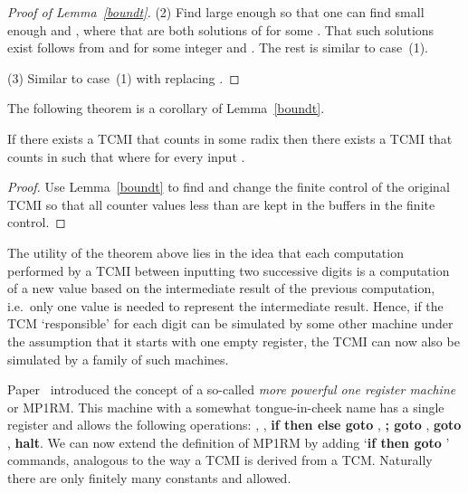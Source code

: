\documentclass[12pt]{article}
\begin{document}
\begin{proof}[Proof of Lemma~\ref{boundt}]
(2) Find  large enough so that one can find small enough  and
, where  that are both solutions of  for some . That such
solutions exist follows from  and  for some integer  and . The rest is
similar to case~(1).

(3) Similar to case~(1) with  replacing .
\end{proof}

The following theorem is a corollary of Lemma~\ref{boundt}.
\begin{theorem}\label{tcmired}
If there exists a TCMI that counts in some radix  then
there exists a TCMI  that counts in  such that
 where  for every input .
\end{theorem}
\begin{proof}
Use Lemma~\ref{boundt} to find  and change the finite control of the
original TCMI so that all counter values less than  are kept in the
buffers in the finite control.
\end{proof}

The utility of the theorem above lies in the idea that each
computation performed by a TCMI between inputting two successive
digits is a computation of a new value based on the intermediate
result of the previous computation, i.e.\ only one value is needed to
represent the intermediate result. Hence, if the TCM `responsible' for
each digit can be
simulated by some other machine under the assumption that it starts
with one empty register, the TCMI can now also be simulated by a family of
such machines.

Paper~\cite{Schroep} introduced the concept of a so-called {\it more
  powerful one register machine\/} or MP1RM. This machine with a
somewhat tongue-in-cheek name has a single register  and allows the
following operations: , , 
{\bf if  then  else goto }, {\bf
  {\rm;} goto }, {\bf goto }, {\bf
  halt}. We can now extend the definition of MP1RM by adding `{\bf if
 then goto }' commands, analogous to the way 
a TCMI is derived from a TCM. Naturally there are only finitely
many constants  and  allowed.
\end{document}
